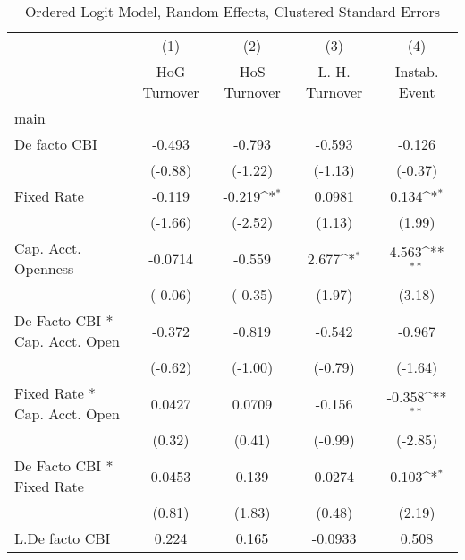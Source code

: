 {
\def\sym#1{\ifmmode^{#1}\else\(^{#1}\)\fi}
\begin{longtable}{l*{4}{c}}
\caption{Ordered Logit Model, Random Effects, Clustered Standard Errors \label{kapintlagordLogLogDF}}\\
\hline\hline\endfirsthead\hline\endhead\hline\endfoot\endlastfoot
                &\multicolumn{1}{c}{(1)}&\multicolumn{1}{c}{(2)}&\multicolumn{1}{c}{(3)}&\multicolumn{1}{c}{(4)}\\
                &\multicolumn{1}{c}{HoG Turnover}&\multicolumn{1}{c}{HoS Turnover}&\multicolumn{1}{c}{L. H. Turnover}&\multicolumn{1}{c}{Instab. Event}\\
\hline
main            &                  &                  &                  &                  \\
De facto CBI    &   -0.493         &   -0.793         &   -0.593         &   -0.126         \\
                &  (-0.88)         &  (-1.22)         &  (-1.13)         &  (-0.37)         \\
[1em]
Fixed Rate      &   -0.119         &   -0.219\sym{*}  &   0.0981         &    0.134\sym{*}  \\
                &  (-1.66)         &  (-2.52)         &   (1.13)         &   (1.99)         \\
[1em]
Cap. Acct. Openness&  -0.0714         &   -0.559         &    2.677\sym{*}  &    4.563\sym{**} \\
                &  (-0.06)         &  (-0.35)         &   (1.97)         &   (3.18)         \\
[1em]
De Facto CBI * Cap. Acct. Open&   -0.372         &   -0.819         &   -0.542         &   -0.967         \\
                &  (-0.62)         &  (-1.00)         &  (-0.79)         &  (-1.64)         \\
[1em]
Fixed Rate * Cap. Acct. Open&   0.0427         &   0.0709         &   -0.156         &   -0.358\sym{**} \\
                &   (0.32)         &   (0.41)         &  (-0.99)         &  (-2.85)         \\
[1em]
De Facto CBI * Fixed Rate&   0.0453         &    0.139         &   0.0274         &    0.103\sym{*}  \\
                &   (0.81)         &   (1.83)         &   (0.48)         &   (2.19)         \\
[1em]
L.De facto CBI  &    0.224         &    0.165         &  -0.0933         &    0.508         \\

\end{longtable}}
